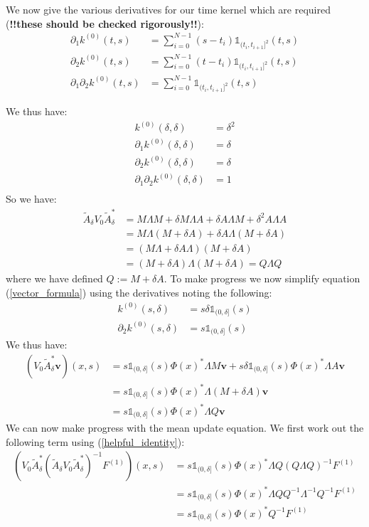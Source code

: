 \documentclass{article}
\theoremstyle{definition}
\theoremstyle{remark}
\theoremstyle{remark}
\begin{document}
\noindent We now give the various derivatives for our time kernel which are required (\textbf{!!these should be checked rigorously!!}):
\begin{align*}
    \partial_{1}k^{(0)}(t,s) &= \sum_{i=0}^{N-1}(s-t_{i})\mathbb{1}_{(t_{i},t_{i+1}]^{2}}(t,s) \\
    \partial_{2}k^{(0)}(t,s) &= \sum_{i=0}^{N-1}(t-t_{i})\mathbb{1}_{(t_{i},t_{i+1}]^{2}}(t,s) \\
    \partial_{1}\partial_{2}k^{(0)}(t,s) &= \sum_{i=0}^{N-1}\mathbb{1}_{(t_{i},t_{i+1}]^{2}}(t,s)
\end{align*}

\noindent We thus have:
\begin{align*}
    k^{(0)}(\delta,\delta) &= \delta^2 \\
    \partial_{1}k^{(0)}(\delta,\delta) &= \delta \\
    \partial_{2}k^{(0)}(\delta,\delta) &= \delta \\
    \partial_{1}\partial_{2}k^{(0)}(\delta,\delta) &= 1 \\
\end{align*}
So we have:
\begin{align*}
    \tilde{A}_{\delta}V_{0}\tilde{A}_{\delta}^{*} &= M\Lambda M + \delta M\Lambda A + \delta A\Lambda M +  \delta^{2}A\Lambda A \\
    &= M\Lambda(M+\delta A)+\delta A \Lambda(M+\delta A) \\
    &= (M\Lambda+\delta A \Lambda)(M+\delta A) \\
    &= (M+\delta A)\Lambda(M+\delta A) = Q\Lambda Q
\end{align*}
where we have defined $Q:=M+\delta A$. To make progress we now simplify equation (\ref{vector_formula}) using the derivatives noting the following:
\begin{align*}
    k^{(0)}(s,\delta) &= s\delta\mathbb{1}_{(0,\delta]}(s) \\
    \partial_{2}k^{(0)}(s,\delta) &= s\mathbb{1}_{(0,\delta]}(s)
\end{align*}
We thus have:
\begin{align}
    (V_{0}\tilde{A}_{\delta}^{*}\boldsymbol{v})(x,s) &= s\mathbb{1}_{(0,\delta]}(s)\Phi(x)^{*}\Lambda M\boldsymbol{v} + s\delta\mathbb{1}_{(0,\delta]}(s)\Phi(x)^{*}\Lambda A \boldsymbol{v} \nonumber \\
    &=s\mathbb{1}_{(0,\delta]}(s)\Phi(x)^{*}\Lambda(M+\delta A)\mathbf{v} \nonumber \\
    \label{helpful_identity}
    &=s\mathbb{1}_{(0,\delta]}(s)\Phi(x)^{*}\Lambda Q\mathbf{v}
\end{align}
We can now make progress with the mean update equation. We first work out the following term using (\ref{helpful_identity}):
\begin{align*}
    (V_{0}\tilde{A}_{\delta}^{*}(\tilde{A}_{\delta}V_{0}\tilde{A}_{\delta}^{*})^{-1}F^{(1)})(x,s) &= s\mathbb{1}_{(0,\delta]}(s)\Phi(x)^{*}\Lambda Q (Q\Lambda Q)^{-1}F^{(1)} \\
    &=s\mathbb{1}_{(0,\delta]}(s)\Phi(x)^{*}\Lambda Q Q^{-1}\Lambda^{-1}Q^{-1}F^{(1)} \\
    &=s\mathbb{1}_{(0,\delta]}(s)\Phi(x)^{*}Q^{-1}F^{(1)}
\end{align*}
\end{document}

